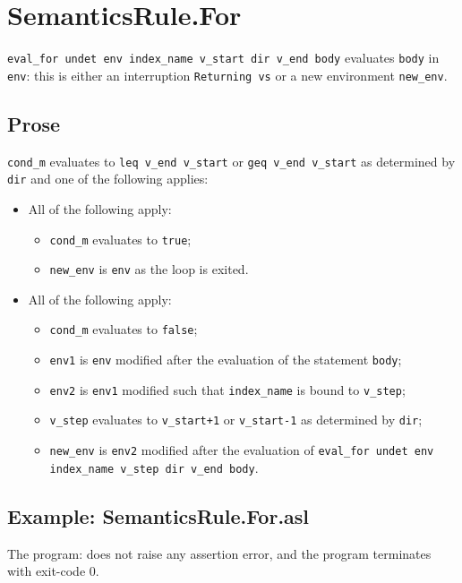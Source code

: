 \documentclass{book}
\begin{document}

\section{SemanticsRule.For \label{sec:SemanticsRule.For}}
\texttt{eval\_for undet env index\_name v\_start dir v\_end body} evaluates
\texttt{body} in \texttt{env}: this is either an interruption \texttt{Returning
vs} or a new environment \texttt{new\_env}.

    \subsection{Prose}
    \texttt{cond\_m} evaluates to \texttt{leq v\_end v\_start} or \texttt{geq
v\_end v\_start} as determined by \texttt{dir} and one of the following
applies:
    \begin{itemize}
    \item All of the following apply:
      \begin{itemize}
      \item \texttt{cond\_m} evaluates to \texttt{true};
      \item \texttt{new\_env} is \texttt{env} as the loop is exited.
      \end{itemize}
    \item All of the following apply:
      \begin{itemize}
      \item \texttt{cond\_m} evaluates to \texttt{false};
      \item \texttt{env1} is \texttt{env} modified after the evaluation of the statement \texttt{body};
      \item \texttt{env2} is \texttt{env1} modified such that \texttt{index\_name} is bound to \texttt{v\_step};
      \item \texttt{v\_step} evaluates to \texttt{v\_start+1} or \texttt{v\_start-1} as determined by \texttt{dir};
      \item \texttt{new\_env} is \texttt{env2} modified after the evaluation of \texttt{eval\_for undet
        env index\_name v\_step dir v\_end body}.
      \end{itemize}
    \end{itemize}

    \subsection{Example: SemanticsRule.For.asl}
    The program:
    does not raise any assertion error, and the program terminates with exit-code 0.
\end{document}
